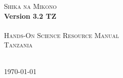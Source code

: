 \begin{titlepage}
\begin{center}
	\textsc{{\Huge Shika na Mikono}}\\[0.4cm]
	\textbf{{\huge Version 3.2 TZ}}\\[1.5cm]
	\HRule\\[0.4cm]
	\textsc{{\Large Hands-On Science Resource Manual}}\\[0.4cm]
	\textsc{{\Large Tanzania}}\\[0.4cm]
	\HRule\\[0.5cm]
\end{center}

\vfill
\begin{center}
	{\large \today}
\end{center}
\end{titlepage}
